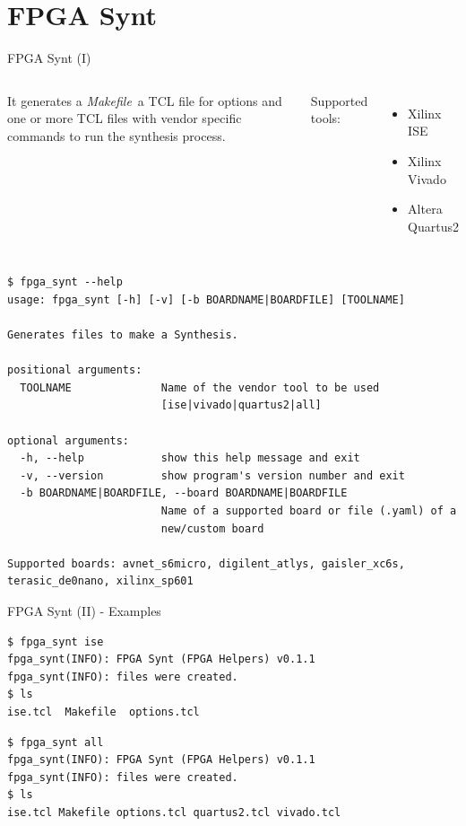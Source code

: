 \documentclass{beamer}
\newcommand{\makefile}       {\textit{Makefile}}
\begin{document}

\section{FPGA Synt}

\begin{frame}[fragile]{FPGA Synt (I)}
  \begin{columns}
      \begin{block}{}
        \small
        It generates a \makefile\ a TCL file for options and one or more TCL files
        with vendor specific commands to run the synthesis process.
      \end{block}{}
      \small Supported tools:
      \begin{itemize}
        \tiny
        \item Xilinx ISE
        \item Xilinx Vivado
        \item Altera Quartus2
      \end{itemize}
  \end{columns}
  \scriptsize
  \begin{verbatim}
$ fpga_synt --help
usage: fpga_synt [-h] [-v] [-b BOARDNAME|BOARDFILE] [TOOLNAME]

Generates files to make a Synthesis.

positional arguments:
  TOOLNAME              Name of the vendor tool to be used
                        [ise|vivado|quartus2|all]

optional arguments:
  -h, --help            show this help message and exit
  -v, --version         show program's version number and exit
  -b BOARDNAME|BOARDFILE, --board BOARDNAME|BOARDFILE
                        Name of a supported board or file (.yaml) of a
                        new/custom board

Supported boards: avnet_s6micro, digilent_atlys, gaisler_xc6s,
terasic_de0nano, xilinx_sp601
  \end{verbatim}
\end{frame}

\begin{frame}[fragile]{FPGA Synt (II) - Examples}
  \begin{verbatim}
$ fpga_synt ise
fpga_synt(INFO): FPGA Synt (FPGA Helpers) v0.1.1
fpga_synt(INFO): files were created.
$ ls
ise.tcl  Makefile  options.tcl
  \end{verbatim}
  \begin{verbatim}
$ fpga_synt all
fpga_synt(INFO): FPGA Synt (FPGA Helpers) v0.1.1
fpga_synt(INFO): files were created.
$ ls
ise.tcl Makefile options.tcl quartus2.tcl vivado.tcl
  \end{verbatim}
\end{frame}
\end{document}
